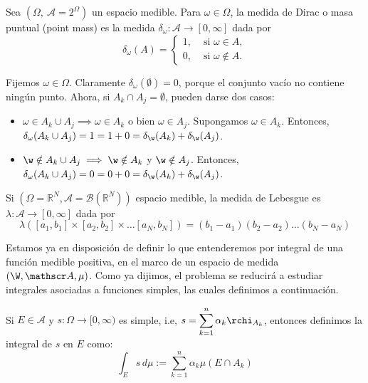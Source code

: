 \begin{ejemplo}
Sea $(\Omega,\ \mathscr A=2^\Omega)$ un espacio medible. Para $\omega\in\Omega$, la medida de Dirac  o masa puntual (point mass) es la medida $\delta_\omega:\mathscr A \longrightarrow [0,\infty ]$ dada por
 \[
 \delta_\omega (A) = \left\{ \begin{array}{ll}
                                1, & \text{ si } \omega\in A,
                               \\
                               0 , &  \text{ si } \omega\not\in A.
                              \end{array}
                              \right.
 \]

 Fijemos $\omega \in \Omega$. Claramente $\delta_\omega(\emptyset) = 0$, porque el conjunto vacío no contiene ningún punto. Ahora, si $A_k \cap A_j = \emptyset$, pueden darse dos casos:

\begin{itemize}
    \item $\omega \in A_k\cup A_j \implies \omega \in A_k$ o bien $\omega \in A_j$. Supongamos $\omega \in A_k$. Entonces, $\delta_\omega(A_k\cup A_j) = 1 = 1 + 0 = \delta_\w(A_k) + \delta_\w(A_j)$.
    \item $\w \notin A_k\cup A_j \implies \w \notin A_k$ y $\w \notin A_j$. Entonces, $\delta_\omega(A_k\cup A_j) = 0 = 0 + 0 =\delta_\w(A_k) + \delta_\w(A_j)$.
\end{itemize}

\end{ejemplo}

\begin{ejemplo}
	 Si $(\Omega = \mathbb R^N, \mathscr A= \mathcal B(\mathbb R^N))$ espacio medible, la medida de Lebesgue es $\lambda: \mathscr A \to [0,\infty]$ dada por
 \[
 \lambda ([a_1,b_1]\times  [a_2,b_2]\times \dots [a_N,b_N]) = (b_1-a_1) (b_2-a_2) \dots (b_N-a_N)
 \]
\end{ejemplo}

Estamos ya en disposición de definir lo que entenderemos por integral de una función medible positiva, en el marco de un espacio de medida $(\W, \mathscr A, \mu)$. Como ya dijimos, el problema se reducirá a estudiar integrales asociadas a funciones simples, las cuales definimos a continuación.

\begin{ndef}
  Si $E \in \mathscr A$ y $s:\Omega \to [0,\infty)$ es simple, i.e, $\displaystyle s= \sum_{k=1}^n \alpha_k \rchi_{A_k}$, entonces definimos la integral de $s$ en $E$ como:
  \[
    \int_E s\, d\mu := \sum_{k=1}^n \alpha_k \mu(E\cap A_k)
  \]
\end{ndef}

